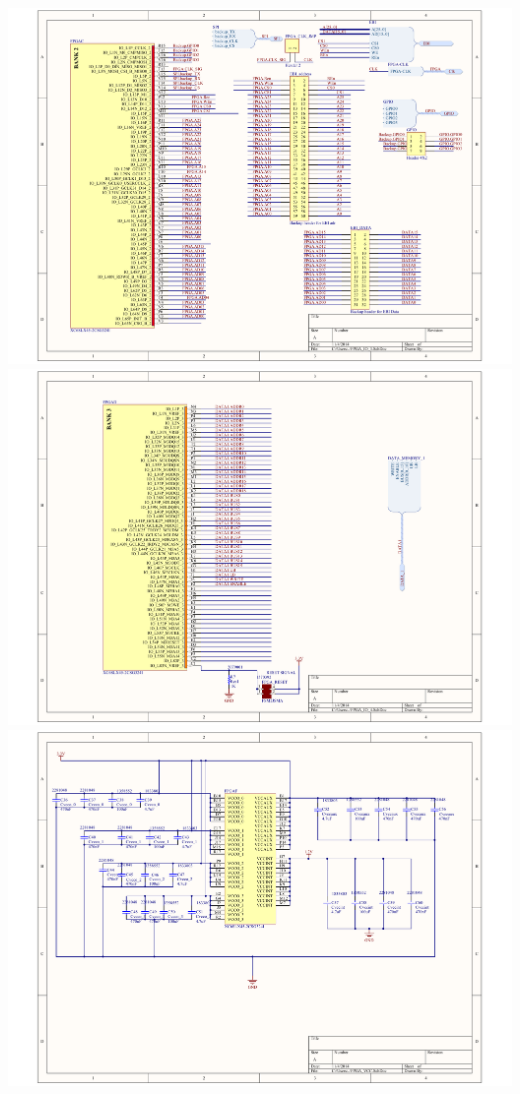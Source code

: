 \documentclass[../main/report.tex]{subfiles}
\begin{document}
\newpage
\includegraphics[width=\paperwidth]{../appendix/PCB_schematics/FPGA_IO_3.PDF}
\newpage
\includegraphics[width=\paperwidth]{../appendix/PCB_schematics/FPGA_IO_4.PDF}
\newpage
\includegraphics[width=\paperwidth]{../appendix/PCB_schematics/FPGA_VCC.PDF}
\end{document}
